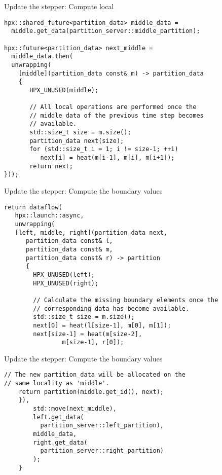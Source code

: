 \documentclass[\classoption]{beamer}
\begin{document}
\begin{frame}[fragile]{Update the stepper: Compute local}

\begin{lstlisting}
hpx::shared_future<partition_data> middle_data =
  middle.get_data(partition_server::middle_partition);
  
hpx::future<partition_data> next_middle = 
  middle_data.then(
  unwrapping(
    [middle](partition_data const& m) -> partition_data
    {
       HPX_UNUSED(middle);

       // All local operations are performed once the 
       // middle data of the previous time step becomes 
       // available.
       std::size_t size = m.size();
       partition_data next(size);
       for (std::size_t i = 1; i != size-1; ++i)
          next[i] = heat(m[i-1], m[i], m[i+1]);
       return next;
}));
\end{lstlisting}

\end{frame}

\begin{frame}[fragile]{Update the stepper: Compute the boundary values}

\begin{lstlisting}
return dataflow(
   hpx::launch::async,
   unwrapping(
   [left, middle, right](partition_data next, 
      partition_data const& l,
      partition_data const& m, 
      partition_data const& r) -> partition
      {
        HPX_UNUSED(left);
        HPX_UNUSED(right);

        // Calculate the missing boundary elements once the
        // corresponding data has become available.
        std::size_t size = m.size();
        next[0] = heat(l[size-1], m[0], m[1]);
        next[size-1] = heat(m[size-2], 
        		m[size-1], r[0]);
\end{lstlisting}

\end{frame}

\begin{frame}[fragile]{Update the stepper: Compute the boundary values}

\begin{lstlisting}
// The new partition_data will be allocated on the 
// same locality as 'middle'.
	return partition(middle.get_id(), next);
	}),
		std::move(next_middle),
		left.get_data(
		  partition_server::left_partition),
		middle_data,
		right.get_data(
		  partition_server::right_partition)
        );
    }
\end{lstlisting}

\end{frame}
\end{document}
